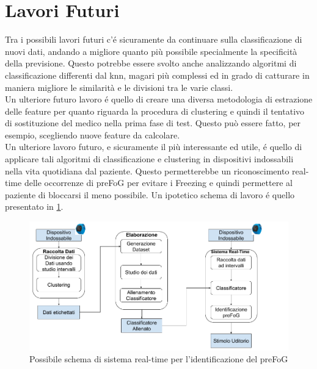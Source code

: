 \section{Lavori Futuri}
Tra i possibili lavori futuri c'é sicuramente da continuare sulla classificazione di nuovi dati, andando a migliore quanto più possibile specialmente la specificità della previsione. Questo potrebbe essere svolto anche analizzando algoritmi di classificazione differenti dal knn, magari più complessi ed in grado di catturare in maniera migliore le similarità e le divisioni tra le varie classi.\\
Un ulteriore futuro lavoro é quello di creare una diversa metodologia di estrazione delle feature per quanto riguarda la procedura di clustering e quindi il tentativo di sostituzione del medico nella prima fase di test. Questo può essere fatto, per esempio, scegliendo nuove feature da calcolare.\\
Un ulteriore lavoro futuro, e sicuramente il più interessante ed utile, é quello di applicare tali algoritmi di classificazione e clustering in dispositivi indossabili nella vita quotidiana dal paziente. Questo permetterebbe un riconoscimento real-time delle occorrenze di preFoG per evitare i Freezing e quindi permettere al paziente di bloccarsi il meno possibile. Un ipotetico schema di lavoro é quello presentato in \ref{LavoroFuturo}.
\begin{figure}[h]
	\centering
	\includegraphics[width=1\textwidth]{images/LavoroFuturo.png}
	\caption{Possibile schema di sistema real-time per l'identificazione del preFoG}
	\label{LavoroFuturo}
\end{figure}
